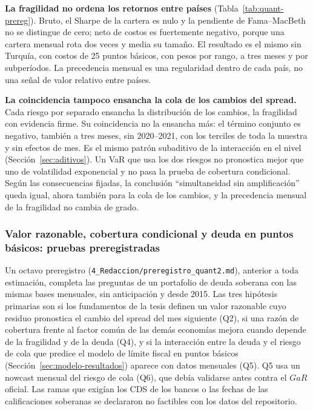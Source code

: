 \textbf{La fragilidad no ordena los retornos entre países} (Tabla~\ref{tab:quant-prereg}). Bruto, el Sharpe de la cartera es nulo y la pendiente de Fama--MacBeth no se distingue de cero; neto de costos es fuertemente negativo, porque una cartera mensual rota dos veces y media su tamaño. El resultado es el mismo sin Turquía, con costos de 25 puntos básicos, con pesos por rango, a tres meses y por subperíodos. La precedencia mensual es una regularidad dentro de cada país, no una señal de valor relativo entre países.

\textbf{La coincidencia tampoco ensancha la cola de los cambios del spread.} Cada riesgo por separado ensancha la distribución de los cambios, la fragilidad con evidencia firme. Su coincidencia no la ensancha más: el término conjunto es negativo, también a tres meses, sin 2020--2021, con los terciles de toda la muestra y sin efectos de mes. Es el mismo patrón subaditivo de la interacción en el nivel (Sección~\ref{sec:aditivos}). Un VaR que usa los dos riesgos no pronostica mejor que uno de volatilidad exponencial y no pasa la prueba de cobertura condicional. Según las consecuencias fijadas, la conclusión ``simultaneidad sin amplificación'' queda igual, ahora también para la cola de los cambios, y la precedencia mensual de la fragilidad no cambia de grado.

\subsubsection{Valor razonable, cobertura condicional y deuda en puntos básicos: pruebas preregistradas}
\label{sec:quant2-prereg}

Un octavo preregistro (\texttt{4\_Redaccion/preregistro\_quant2.md}), anterior a toda estimación, completa las preguntas de un portafolio de deuda soberana con las mismas bases mensuales, sin anticipación y desde 2015. Las tres hipótesis primarias son si los fundamentos de la tesis definen un valor razonable cuyo residuo pronostica el cambio del spread del mes siguiente (Q2), si una razón de cobertura frente al factor común de las demás economías mejora cuando depende de la fragilidad y de la deuda (Q4), y si la interacción entre la deuda y el riesgo de cola que predice el modelo de límite fiscal en puntos básicos (Sección~\ref{sec:modelo-resultados}) aparece con datos mensuales (Q5). Q5 usa un nowcast mensual del riesgo de cola (Q6), que debía validarse antes contra el $GaR$ oficial. Las ramas que exigían los CDS de los bancos o las fechas de las calificaciones soberanas se declararon no factibles con los datos del repositorio.

